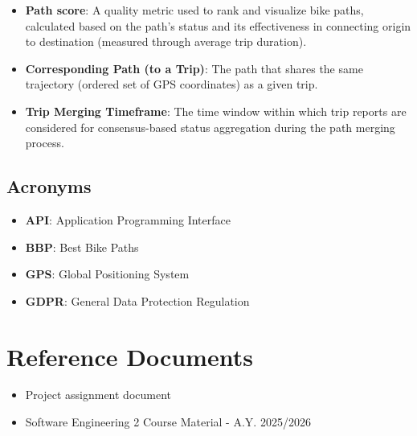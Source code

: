 \begin{itemize}
    \item \textbf{Path score}: A quality metric used to rank and visualize bike paths, calculated based on the path's status and its effectiveness in connecting origin to destination (measured through average trip duration).
    \item \textbf{Corresponding Path (to a Trip)}: The path that shares the same trajectory (ordered set of GPS coordinates) as a given trip.
    \item \textbf{Trip Merging Timeframe}: The time window within which trip reports are considered for consensus-based status aggregation during the path merging process.
\end{itemize}

\subsection{Acronyms}
\begin{itemize}
    \item \textbf{API}: Application Programming Interface
    \item \textbf{BBP}: Best Bike Paths
    \item \textbf{GPS}: Global Positioning System
    \item \textbf{GDPR}: General Data Protection Regulation
\end{itemize}

\section{Reference Documents}
\label{sec:references}
\begin{itemize}
    \item Project assignment document
    \item Software Engineering 2 Course Material - A.Y. 2025/2026
\end{itemize}

